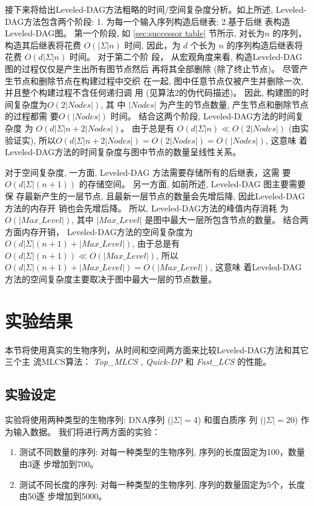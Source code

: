 接下来将给出Leveled-DAG方法粗略的时间/空间复杂度分析。如上所述,
Leveled-DAG方法包含两个阶段: 1. 为每一个输入序列构造后继表; 2.基于后继
表构造Leveled-DAG图。 第一个阶段, 如 \ref{sec:successor table} 节所示,
对长为$n$ 的序列，构造其后继表将花费 $O(|\Sigma|n)$ 时间, 因此，为 $d$
个长为 $n$ 的序列构造后继表将花费 $O(d|\Sigma|n)$ 时间。 对于第二个阶
段， 从宏观角度来看, 构造Leveled-DAG 图的过程仅仅是产生出所有图节点然后
再将其全部删除 (除了终止节点)。 尽管产生节点和删除节点在构建过程中交织
在一起, 图中任意节点仅被产生并删除一次, 并且整个构建过程不含任何递归调
用 (见算法2的伪代码描述)。 因此, 构建图的时间复杂度为$O(2|Nodes|)$, 其
中 $|Nodes|$ 为产生的节点数量, 产生节点和删除节点的过程都需
要$O(|Nodes|)$ 时间。 结合这两个阶段, Leveled-DAG方法的时间复杂度
为 $O(d|\Sigma|n + 2|Nodes|)$。 由于总是有 $O(d|\Sigma|n) \ll
O(2|Nodes|)$ (由实验证实),
所以$O(d|\Sigma|n + 2|Nodes|) = O(2|Nodes|) = O(|Nodes|)$, 这意味
着Leveled-DAG方法的时间复杂度与图中节点的数量呈线性关系。

对于空间复杂度, 一方面, Leveled-DAG 方法需要存储所有的后继表，这需
要 $O(d|\Sigma|(n+1))$ 的存储空间。 另一方面, 如前所述, Leveled-DAG 图主要需要保
存最新产生的一层节点, 且最新一层节点的数量会先增后降, 因此Leveled-DAG方法的内存开
销也会先增后降。 所以, Leveled-DAG方法的峰值内存消耗
为 $O(|Max\_Level|)$, 其中 $|Max\_Level|$ 是图中最大一层所包含节点的数量。 结合两
方面内存开销， Leveled-DAG方法的空间复杂度为 $O(d|\Sigma|(n+1) + |Max\_Level|)$,
由于总是有 $O(d|\Sigma|(n+1)) \ll O(|Max\_Level|)$, 所以
$O(d|\Sigma|(n+1) + |Max\_Level|) = O(|Max\_Level|)$, 这意味
着Leveled-DAG方法的空间复杂度主要取决于图中最大一层的节点数量。


\section{实验结果}
\label{sec:experiments}

本节将使用真实的生物序列，从时间和空间两方面来比较Leveled-DAG方法和其它三个主
流MLCS算法： \emph{Top\_MLCS} \cite{Li2016_ICDE}, \emph{Quick-DP}
\cite{Wang2011} 和 \emph{Fast\_LCS} \cite{Chen2006} 的性能。

\subsection{实验设定}
\label{Test problems}

实验将使用两种类型的生物序列: DNA序列 ($|\Sigma|=4$) 和蛋白质序
列 ($|\Sigma|=20$) 作为输入数据。 我们将进行两方面的实验：

\begin{enumerate}
\item 测试不同数量的序列: 对每一种类型的生物序列, 序列的长度固定为100，数量由3逐
  步增加到700。
\item 测试不同长度的序列: 对每一种类型的生物序列, 序列的数量固定为5个，长度由50逐
  步增加到5000。
\end{enumerate}

